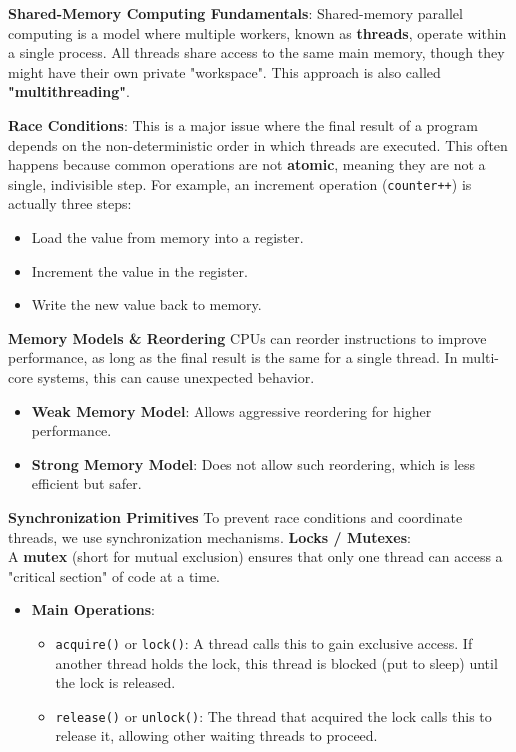 \documentclass[10pt, a4paper]{article}
\begin{document}
\begin{multicols}{3}
\textbf{Shared-Memory Computing Fundamentals}:
Shared-memory parallel computing is a model where multiple workers, known as \textbf{threads}, operate within a single process. All threads share access to the same main memory, though they might have their own private "workspace". This approach is also called \textbf{"multithreading"}.

\textbf{Race Conditions}:
This is a major issue where the final result of a program depends on the non-deterministic order in which threads are executed. This often happens because common operations are not \textbf{atomic}, meaning they are not a single, indivisible step. For example, an increment operation (\texttt{counter++}) is actually three steps:
\begin{itemize}
    \item Load the value from memory into a register.
    \item Increment the value in the register.
    \item Write the new value back to memory.
\end{itemize}
\textbf{Memory Models \& Reordering}
CPUs can reorder instructions to improve performance, as long as the final result is the same for a single thread. In multi-core systems, this can cause unexpected behavior.
\begin{itemize}
    \item \textbf{Weak Memory Model}: Allows aggressive reordering for higher performance.
    \item \textbf{Strong Memory Model}: Does not allow such reordering, which is less efficient but safer.
\end{itemize}
\textbf{Synchronization Primitives}
To prevent race conditions and coordinate threads, we use synchronization mechanisms.
\textbf{Locks / Mutexes}: \\
A \textbf{mutex} (short for mutual exclusion) ensures that only one thread can access a "critical section" of code at a time.
\begin{itemize}[nosep] %
    \item \textbf{Main Operations}:
    \begin{itemize}[nosep] %
        \item \texttt{acquire()} or \texttt{lock()}: A thread calls this to gain exclusive access. If another thread holds the lock, this thread is blocked (put to sleep) until the lock is released.
        \item \texttt{release()} or \texttt{unlock()}: The thread that acquired the lock calls this to release it, allowing other waiting threads to proceed.

\end{itemize}
\end{itemize}
\end{multicols}
\end{document}
